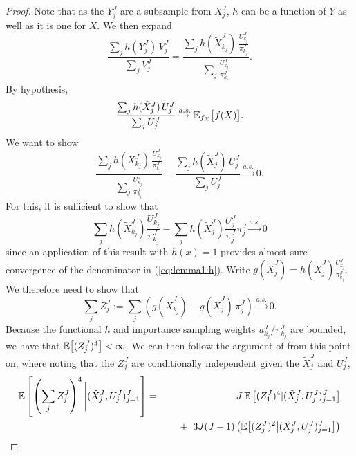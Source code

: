 \begin{proof}
    Note that as the $Y_j^J$ are a subsample from $X_j^J$, $h$ can be a function of $Y$ as well as it is one for $X$. We then expand
    \begin{equation}\frac{\sum_j h(Y_j^J) \, V_j^J}{\sum_j V_j^J} = \frac{\sum_j h(\tilde X_{k_j}^J)\, \frac{U_{k_j}^J}{\pi_{k_j}^J}}{\sum_j \frac{U_{k_j}^J}{\pi_{k_j}^J}}.\end{equation}
    By hypothesis,
    \begin{equation}
    \frac{\sum_j h(\tilde X_j^J)\, U_j^J}{\sum_j U_j^J} \stackrel{a.s.}{\to} \mathbb{E}_{f_X}\big[f(X)\big].
    \end{equation}
    We want to show
    \begin{equation}\label{eq:lemma1:h}
    \frac{\sum_j h(X_{k_j}^J)\, \frac{U_{k_j}^J}{\pi_{k_j}^J}}{\sum_j \frac{U_{k_j}^J}{\pi_{k_j}^J}} - \frac{\sum_j h(\tilde X_j^J)\, U_j^J}{\sum_j U_j^J} \stackrel{a.s.}{\to} 0.
    \end{equation}
    For this, it is sufficient to show that
   \begin{equation} 
   \sum_j h(\tilde X_{k_j}^J)\frac{U_{k_j}^J}{\pi_{k_j}^J}
    -  \sum_j h(\tilde X_j^J)\frac{U_j^J}{\pi_j^J}\pi_j^J \stackrel{a.s.}{\to} 0 
    \end{equation}
    since an application of this result with $h(x)=1$ provides almost sure convergence of the denominator in (\ref{eq:lemma1:h}).
    Write $g(\tilde X_j^J) = h(\tilde X_j^J)\frac{U_{k_j}^J}{\pi_{k_j}^J}$. We therefore need to show that 
    \begin{equation}
    \sum_j Z_j^J := \sum_j \left(g(\tilde X_{k_j}^J) -  g(\tilde X_j^J) \, \pi_j^J \right) \stackrel{a.s.}{\to} 0.
\end{equation}
    Because the functional $h$ and importance sampling weights $u_{k_j}^J/\pi_{k_j}^J$ are bounded, we have that $\mathbb{E}\big[(Z_j^J)^4\big] < \infty$. We can then follow the argument of \cite{chopin20} from this point on, where noting that the $Z_j^J$ are conditionally independent given the $\tilde{X}_j^J$ and $U_j^J$,
    \begin{eqnarray} 
    \E\left[\left(\sum_j Z_j^J\right)^4 \Bigg| (\tilde X_j^J,U_j^J)_{j=1}^J \right] 
    &=& J\, \E\left[(Z_1^J)^4|(\tilde X_j^J,U_j^J)_{j=1}^J\right] 
    \nonumber
    \\
    && \hspace{5mm}+ \hspace{2mm} 3J(J-1)\left(\E\big[(Z_j^J)^2\big|(\tilde X_j^J,U_j^J)_{j=1}^J\big]\right) 
    \\ 

\end{eqnarray}
\end{proof}
